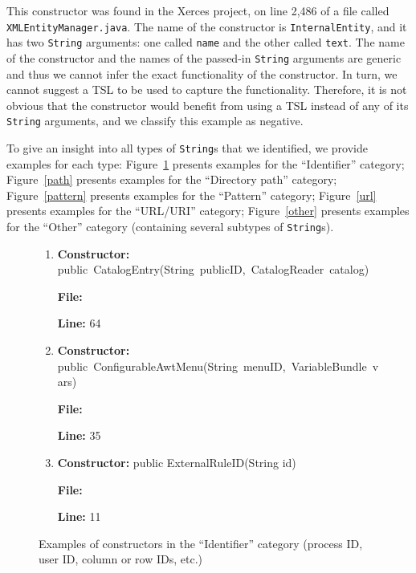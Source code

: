 \vspace{10px}

This constructor was found in the Xerces project, on line 2,486 of a file called \mbox{\lstinline{XMLEntityManager.java}}. The name of the constructor is \lstinline{InternalEntity}, and it has two \lstinline{String} arguments: one called \lstinline{name} and the other called \lstinline{text}. The name of the constructor and the names of the passed-in \lstinline{String} arguments are generic and thus we cannot infer the exact functionality of the constructor. In turn, we cannot suggest a TSL to be used to capture the functionality. Therefore, it is not obvious that the constructor would benefit from using a TSL instead of any of its \lstinline{String} arguments, and we classify this example as negative.

To give an insight into all types of \lstinline{String}s that we identified, we provide examples for each type: Figure~\ref{identifier} presents examples for the ``Identifier'' category; Figure~\ref{path} presents examples for the ``Directory path'' category; Figure~\ref{pattern} presents examples for the ``Pattern'' category; Figure~\ref{url} presents examples for the ``URL/URI'' category; Figure~\ref{other} presents examples for the ``Other'' category (containing several subtypes of \lstinline{String}s).



\begin{figure}

\begin{enumerate}

\item
\textbf{Constructor:} \mbox{public CatalogEntry(String publicID, CatalogReader catalog)}

\textbf{File:} 

\textbf{Line:} 64

\vspace{6px}

\item
\textbf{Constructor:} \mbox{public ConfigurableAwtMenu(String menuID, VariableBundle vars)}

\textbf{File:} 

\textbf{Line:} 35

\vspace{6px}

\item
\textbf{Constructor:} public ExternalRuleID(String id)

\textbf{File:} 

\textbf{Line:} 11

\end{enumerate}

\vspace{-12px}

\caption{Examples of constructors in the ``Identifier'' category (process ID, user ID, column or row IDs, etc.)}
\label{identifier}
\end{figure}



